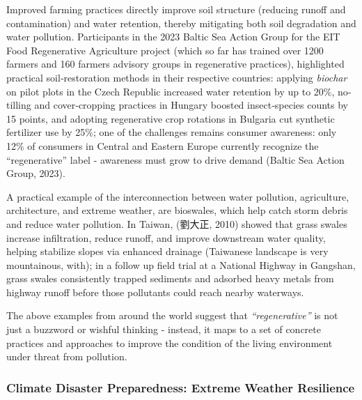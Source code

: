 \documentclass[
  12pt,
  letterpaper,
  DIV=11,
  numbers=noendperiod]{scrartcl}
\begin{document}
Improved farming practices directly improve soil structure (reducing
runoff and contamination) and water retention, thereby mitigating both
soil degradation and water pollution. Participants in the 2023 Baltic
Sea Action Group for the EIT Food Regenerative Agriculture project
(which so far has trained over 1200 farmers and 160 farmers advisory
groups in regenerative practices), highlighted practical
soil‐restoration methods in their respective countries: applying
\emph{biochar} on pilot plots in the Czech Republic increased water
retention by up to 20\%, no‐tilling and cover‐cropping practices in
Hungary boosted insect‐species counts by 15 points, and adopting
regenerative crop rotations in Bulgaria cut synthetic fertilizer use by
25\%; one of the challenges remains consumer awareness: only 12\% of
consumers in Central and Eastern Europe currently recognize the
``regenerative'' label - awareness must grow to drive demand (Baltic Sea
Action Group, 2023).

A practical example of the interconnection between water pollution,
agriculture, architecture, and extreme weather, are bioswales, which
help catch storm debris and reduce water pollution. In Taiwan, (劉大正,
2010) showed that grass swales increase infiltration, reduce runoff, and
improve downstream water quality, helping stabilize slopes via enhanced
drainage (Taiwanese landscape is very mountainous, with); in a follow up
field trial at a National Highway in Gangshan, grass swales consistently
trapped sediments and adsorbed heavy metals from highway runoff before
those pollutants could reach nearby waterways.

The above examples from around the world suggest that
\emph{``regenerative''} is not just a buzzword or wishful thinking -
instead, it maps to a set of concrete practices and approaches to
improve the condition of the living environment under threat from
pollution.

\subsubsection{Climate Disaster Preparedness: Extreme Weather
Resilience}\label{climate-disaster-preparedness-extreme-weather-resilience}
\end{document}
